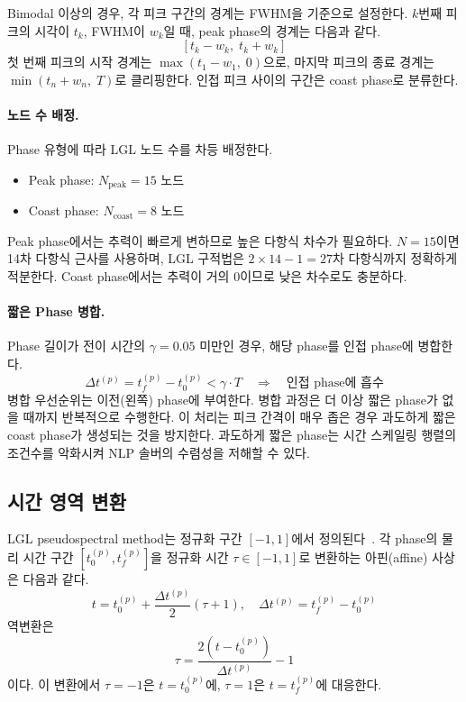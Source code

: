 \documentclass[11pt]{article}
\begin{document}
Bimodal 이상의 경우, 각 피크 구간의 경계는 FWHM을 기준으로 설정한다.
$k$번째 피크의 시각이 $t_k$, FWHM이 $w_k$일 때, peak phase의 경계는 다음과 같다.
\[
[t_k - w_k, \; t_k + w_k]
\]
첫 번째 피크의 시작 경계는 $\max(t_1 - w_1, \; 0)$으로, 마지막 피크의 종료 경계는 $\min(t_n + w_n, \; T)$로 클리핑한다.
인접 피크 사이의 구간은 coast phase로 분류한다.

\paragraph{노드 수 배정.}
Phase 유형에 따라 LGL 노드 수를 차등 배정한다.
\begin{itemize}
  \item Peak phase: $N_\text{peak} = 15$ 노드
  \item Coast phase: $N_\text{coast} = 8$ 노드
\end{itemize}
Peak phase에서는 추력이 빠르게 변하므로 높은 다항식 차수가 필요하다.
$N = 15$이면 14차 다항식 근사를 사용하며, LGL 구적법은 $2 \times 14 - 1 = 27$차 다항식까지 정확하게 적분한다.
Coast phase에서는 추력이 거의 0이므로 낮은 차수로도 충분하다.

\paragraph{짧은 Phase 병합.}
Phase 길이가 전이 시간의 $\gamma = 0.05$ 미만인 경우, 해당 phase를 인접 phase에 병합한다.
\[
\Delta t^{(p)} = t_f^{(p)} - t_0^{(p)} < \gamma \cdot T \quad \Longrightarrow \quad \text{인접 phase에 흡수}
\]
병합 우선순위는 이전(왼쪽) phase에 부여한다.
병합 과정은 더 이상 짧은 phase가 없을 때까지 반복적으로 수행한다.
이 처리는 피크 간격이 매우 좁은 경우 과도하게 짧은 coast phase가 생성되는 것을 방지한다.
과도하게 짧은 phase는 시간 스케일링 행렬의 조건수를 악화시켜 NLP 솔버의 수렴성을 저해할 수 있다.


\subsection{시간 영역 변환}
\label{sec:time_transform}

LGL pseudospectral method는 정규화 구간 $[-1, 1]$에서 정의된다~\cite{Garg2010}.
각 phase의 물리 시간 구간 $[t_0^{(p)}, t_f^{(p)}]$을 정규화 시간 $\tau \in [-1, 1]$로 변환하는 아핀(affine) 사상은 다음과 같다.
\[
t = t_0^{(p)} + \frac{\Delta t^{(p)}}{2}(\tau + 1), \quad \Delta t^{(p)} = t_f^{(p)} - t_0^{(p)}
\]
역변환은
\[
\tau = \frac{2(t - t_0^{(p)})}{\Delta t^{(p)}} - 1
\]
이다. 이 변환에서 $\tau = -1$은 $t = t_0^{(p)}$에, $\tau = 1$은 $t = t_f^{(p)}$에 대응한다.
\end{document}
